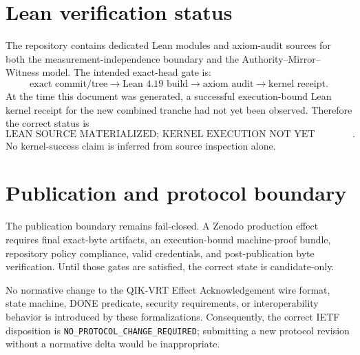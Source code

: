 \documentclass[11pt,a4paper]{article}
\begin{document}
\section{Lean verification status}
The repository contains dedicated Lean modules and axiom-audit sources for both the measurement-independence boundary and the Authority--Mirror--Witness model. The intended exact-head gate is:
\[
\text{exact commit/tree}\rightarrow\text{Lean 4.19 build}\rightarrow\text{axiom audit}\rightarrow\text{kernel receipt}.
\]
At the time this document was generated, a successful execution-bound Lean kernel receipt for the new combined tranche had not yet been observed. Therefore the correct status is
\[
\boxed{\text{LEAN SOURCE MATERIALIZED; KERNEL EXECUTION NOT YET ESTABLISHED}}.
\]
No kernel-success claim is inferred from source inspection alone.

\section{Publication and protocol boundary}
The publication boundary remains fail-closed. A Zenodo production effect requires final exact-byte artifacts, an execution-bound machine-proof bundle, repository policy compliance, valid credentials, and post-publication byte verification. Until those gates are satisfied, the correct state is candidate-only.

No normative change to the QIK-VRT Effect Acknowledgement wire format, state machine, DONE predicate, security requirements, or interoperability behavior is introduced by these formalizations. Consequently, the correct IETF disposition is \texttt{NO\_PROTOCOL\_CHANGE\_REQUIRED}; submitting a new protocol revision without a normative delta would be inappropriate.
\end{document}
